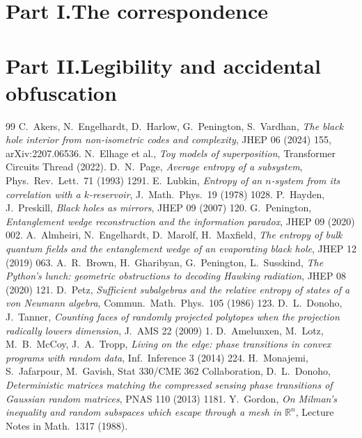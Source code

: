 \documentclass[11pt]{amsart}
\theoremstyle{plain}
\theoremstyle{definition}
\theoremstyle{remark}
\begin{document}
\part*{Part I.\quad The correspondence}


\part*{Part II.\quad Legibility and accidental obfuscation}


\appendix



\begin{thebibliography}{99}
 C.~Akers, N.~Engelhardt, D.~Harlow, G.~Penington, S.~Vardhan, \emph{The black hole interior from non-isometric codes and complexity}, JHEP 06 (2024) 155, arXiv:2207.06536.
 N.~Elhage et al., \emph{Toy models of superposition}, Transformer Circuits Thread (2022).
 D.~N.~Page, \emph{Average entropy of a subsystem}, Phys.\ Rev.\ Lett.\ 71 (1993) 1291.
 E.~Lubkin, \emph{Entropy of an $n$-system from its correlation with a $k$-reservoir}, J.\ Math.\ Phys.\ 19 (1978) 1028.
 P.~Hayden, J.~Preskill, \emph{Black holes as mirrors}, JHEP 09 (2007) 120.
 G.~Penington, \emph{Entanglement wedge reconstruction and the information paradox}, JHEP 09 (2020) 002.
 A.~Almheiri, N.~Engelhardt, D.~Marolf, H.~Maxfield, \emph{The entropy of bulk quantum fields and the entanglement wedge of an evaporating black hole}, JHEP 12 (2019) 063.
 A.~R.~Brown, H.~Gharibyan, G.~Penington, L.~Susskind, \emph{The Python's lunch: geometric obstructions to decoding Hawking radiation}, JHEP 08 (2020) 121.
 D.~Petz, \emph{Sufficient subalgebras and the relative entropy of states of a von Neumann algebra}, Commun.\ Math.\ Phys.\ 105 (1986) 123.
 D.~L.~Donoho, J.~Tanner, \emph{Counting faces of randomly projected polytopes when the projection radically lowers dimension}, J.\ AMS 22 (2009) 1.
 D.~Amelunxen, M.~Lotz, M.~B.~McCoy, J.~A.~Tropp, \emph{Living on the edge: phase transitions in convex programs with random data}, Inf.\ Inference 3 (2014) 224.
 H.~Monajemi, S.~Jafarpour, M.~Gavish, Stat 330/CME 362 Collaboration, D.~L.~Donoho, \emph{Deterministic matrices matching the compressed sensing phase transitions of Gaussian random matrices}, PNAS 110 (2013) 1181.
 Y.~Gordon, \emph{On Milman's inequality and random subspaces which escape through a mesh in $\mathbb R^n$}, Lecture Notes in Math.\ 1317 (1988).

\end{thebibliography}
\end{document}
